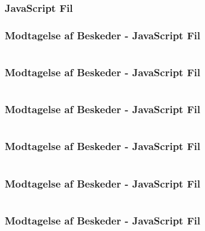 \subsubsection{JavaScript Fil}
\begin{frame}
    \frametitle{Modtagelse af Beskeder - JavaScript Fil}
    \vspace{-1mm}
    \inputminted[fontsize=\footnotesize,highlightlines={}]{javascript}{../src/frontend/part4_recv/logic.js}
\end{frame}
\begin{frame}
    \frametitle{Modtagelse af Beskeder - JavaScript Fil}
    \vspace{-1mm}
    \inputminted[fontsize=\footnotesize,highlightlines={1}]{javascript}{../src/frontend/part4_recv/logic.js}
\end{frame}
\begin{frame}
    \frametitle{Modtagelse af Beskeder - JavaScript Fil}
    \vspace{-1mm}
    \inputminted[fontsize=\footnotesize,highlightlines={2}]{javascript}{../src/frontend/part4_recv/logic.js}
\end{frame}
\begin{frame}
    \frametitle{Modtagelse af Beskeder - JavaScript Fil}
    \vspace{-1mm}
    \inputminted[fontsize=\footnotesize,highlightlines={5}]{javascript}{../src/frontend/part4_recv/logic.js}
\end{frame}
\begin{frame}
    \frametitle{Modtagelse af Beskeder - JavaScript Fil}
    \vspace{-1mm}
    \inputminted[fontsize=\footnotesize,highlightlines={6,13}]{javascript}{../src/frontend/part4_recv/logic.js}
\end{frame}
\begin{frame}
    \frametitle{Modtagelse af Beskeder - JavaScript Fil}
    \vspace{-1mm}
    \inputminted[fontsize=\footnotesize,highlightlines={7,9}]{javascript}{../src/frontend/part4_recv/logic.js}
\end{frame}


